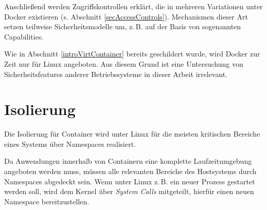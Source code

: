\documentclass[../main.tex]{subfiles}
\begin{document}
	Anschließend werden Zugriffskontrollen erklärt, die in mehreren Variationen unter Docker existieren (s. Abschnitt \ref{secAccessControls}). Mechanismen dieser Art setzen teilweise Sicherheitsmodelle um, z.\,B. auf der Basis von sogenannten Capabilities.




	Wie in Abschnitt \ref{introVirtContainer} bereits geschildert wurde, wird Docker zur Zeit nur für Linux angeboten. Aus diesem Grund ist eine Untersuchung von Sicherheitsfeatures anderer Betriebssysteme in dieser Arbeit irrelevant.




	\section{Isolierung}
  \label{secIsolierung}
		Die Isolierung für Container wird unter Linux für die meisten kritischen Bereiche eines Systems über Namespaces realisiert.

		Da Anwendungen innerhalb von Containern eine komplette Laufzeitumgebung angeboten werden muss, müssen alle relevanten Bereiche des Hostsystems durch Namespaces abgedeckt sein.	Wenn unter Linux z.\,B. ein neuer Prozess gestartet werden soll, wird dem Kernel über \emph{System Calls} mitgeteilt, hierfür einen neuen Namespace bereitzustellen.
\end{document}

